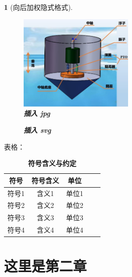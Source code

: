 \documentclass[UTF8]{report}
\theoremstyle{MyLineTheoremStyle} %
\theoremstyle{MyBlockTheoremStyle} %
\theoremstyle{MySubsubsectionStyle} %
\newtheorem{definition}{}
\begin{document}
\begin{definition}[向后加权隐式格式]
\begin{figure}[H]
    \centering
    \includegraphics[width=0.5\textwidth]{assets/波浪能装置示意图.jpg}
    \caption{\textbf{插入 jpg}}\label{插入 jpg}
\end{figure}

\begin{figure}[H]
    \centering
    
    \caption{\textbf{插入 svg}}\label{插入 svg}
\end{figure}

\end{definition}

表格：

\begin{table}[H]
    \centering
    \caption{\textbf{符号含义与约定}}
    \label{tab:waterpump}
    \begin{tabular}{ccccc}
    \toprule
    符号 & 符号含义& 单位\\
    \midrule
    符号1& 含义1& 单位1\\
    符号2& 含义2& 单位2\\
    符号3& 含义3& 单位3\\
    符号4& 含义4& 单位4\\
    \bottomrule
    \end{tabular}
\end{table}

\chapter{这里是第二章}\thispagestyle{fancy} 













\nocite{*}

\thispagestyle{fancy} 
\end{document}
